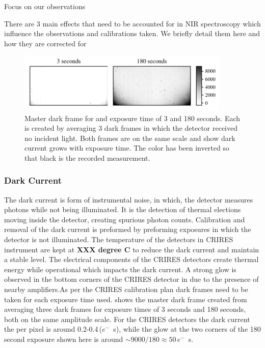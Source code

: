 Focus on our observations

There are 3 main effects that need to be accounted for in NIR spectroscopy which influence the observations and calibrations taken. We briefly detail them here and how they are corrected for

\begin{figure}[h]
\centering
\includegraphics[width=0.9\textwidth]{figures/reduction/master_darks_1.pdf}
\caption{Master dark frame for and exposure time of  3 and 180 seconds. Each is created by averaging 3 dark frames in which the detector received no incident light. Both frames are on the same scale and show dark current grows with exposure time. The color has been inverted so that black is the recorded measurement.}
\label{fig:darkcurrent}
\end{figure}

\subsubsection{Dark Current}
The dark current is form of instrumental noise, in which, the detector measures photons while not being illuminated. It is the detection of thermal elections moving inside the detector, creating spurious photon counts. Calibration and removal of the dark current is preformed by preforming exposures in which the detector is not illuminated. 
 The temperature of the detectors in CRIRES instrument are kept at \textbf{XXX degree C} to reduce the dark current and maintain a stable level. The electrical components of the CRIRES detectors create thermal energy while operational which impacts the dark current. A strong glow is observed in the bottom corners of the CRIRES detector in  due to the presence of nearby amplifiers.As per the CRIRES calibration plan dark frames need to be taken for each exposure time used.  shows the master dark frame created from averaging three dark frames for exposure times of 3 seconds and 180 seconds, both on the same amplitude scale.
For the CRIRES detectors the dark current the per pixel is around 0.2-0.4\,(\(e^{-}\)\si{\per\second}), while the glow at the two corners of the 180 second exposure shown here is around \(\sim9000 / 180\approx50\)\,\(e^{-}\)\si{\per\second}.




